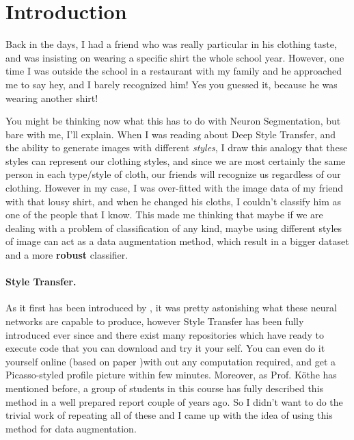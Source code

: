 \documentclass[12pt, a4paper]{scrartcl}
\begin{document}
\tableofcontents
\pagebreak






\section{Introduction}

Back in the days, I had a friend who was really particular in his clothing taste, and was insisting on wearing a specific shirt the whole school year. However, one time I was outside the school in a restaurant with my family and he approached  me to say hey, and I barely recognized him! Yes you guessed it, because he was wearing another shirt!

You might be thinking now what this has to do with Neuron Segmentation, but bare with me, I'll explain. When I was reading about Deep Style Transfer, and the ability to generate images with different \emph{styles}, I draw this analogy that these styles can represent our clothing styles, and since we are most certainly the same person in each type/style of cloth, our friends will recognize us regardless of our clothing. However in my case, I was over-fitted with the image data of my friend with that lousy shirt, and when he changed his cloths, I couldn't classify him as one of the people that I know. This made me thinking that maybe if we are dealing with a problem of classification of any kind, maybe using different styles of image can act as a data augmentation method, which result in a bigger dataset and a more \textbf{robust} classifier.

\paragraph{Style Transfer.}  As it first has been introduced by \cite{Gatys2015}, it was pretty astonishing what these neural networks are capable to produce, however Style Transfer has been fully introduced ever since and there exist many repositories which have ready to execute code that you can download and try it your self. You can even do it yourself online \cite{Deepart} (based on paper \cite{Simonyan14c})with out any computation required, and get a Picasso-styled profile picture within few minutes. Moreover, as Prof. Köthe has mentioned before, a group of students in this course has fully described this method in a well prepared report couple of years ago. So I didn't want to do the trivial work of repeating all of these and I came up with the idea of using this method for data augmentation. 
\end{document}
